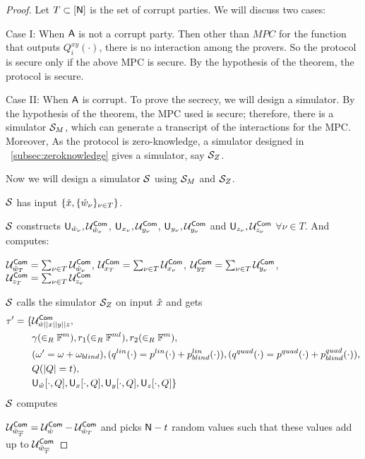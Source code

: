 \begin{proof}
	Let $T\subset [\mathsf{N}]$ is the set of corrupt parties.
	We will discuss two cases: 
	
	Case I: When $\mathsf{A}$ is not a corrupt party.
	Then other than $MPC$ for the function that outputs $Q^{xy}_i(\cdot)$, there is no interaction among the provers. So the protocol is secure only if the above MPC is secure. By the hypothesis of the theorem, the protocol is secure.
	
	Case II: When $\mathsf{A}$ is corrupt.
	To prove the secrecy, we will design a simulator. 
	By the hypothesis of the theorem, the MPC used is secure; therefore, there is a simulator $\mathcal{S}_{M}$, which can generate a transcript of the interactions for the MPC.
	Moreover, As the protocol is zero-knowledge, a simulator designed in ~\ref{subsec:zeroknowledge} gives a simulator, say $\mathcal{S}_{Z}$.
	
	Now we will design a simulator $\mathcal{S}$ using $\mathcal{S}_{M}$ and $\mathcal{S}_{Z}$.
	
	$\mathcal{S}$ has input $\{\hat{x}, \{\hat{w}_{\nu}\}_{\nu \in T}\}$.
	
	$\mathcal{S}$ constructs $\mathsf{U}_{\hat{w}_{\nu}}, \mathcal{U}^{\mathsf{Com}}_{\hat{w}_{\nu}}$, $\mathsf{U}_{x_{\nu}}, \mathcal{U}^{\mathsf{Com}}_{y_{\nu}}$, $\mathsf{U}_{y_{\nu}}, \mathcal{U}^{\mathsf{Com}}_{y_{\nu}}$ and $\mathsf{U}_{z_{\nu}}, \mathcal{U}^{\mathsf{Com}}_{z_{\nu}}$ $\forall \nu\in T$.
	And computes:
	
	\noindent $\mathcal{U}^{\mathsf{Com}}_{\hat{w}_{T}} = \sum_{\nu \in T} \mathcal{U}^{\mathsf{Com}}_{\hat{w}_{\nu}}$,
	$\mathcal{U}^{\mathsf{Com}}_{x_{T}} = \sum_{\nu \in T} \mathcal{U}^{\mathsf{Com}}_{x_{\nu}}$,	
	$\mathcal{U}^{\mathsf{Com}}_{y_{T}} = \sum_{\nu \in T} \mathcal{U}^{\mathsf{Com}}_{y_{\nu}}$,	
	$\mathcal{U}^{\mathsf{Com}}_{z_{T}} = \sum_{\nu \in T} \mathcal{U}^{\mathsf{Com}}_{z_{\nu}}$
	
	\noindent $\mathcal{S}$ calls the simulator $\mathcal{S}_{Z}$ on input $\hat{x}$ and gets 
	\begin{align*}
	\tau' = \{
	& \mathcal{U}^{\mathsf{Com}}_{\hat{w}||x||y||z},\\
	& \gamma(\in_R \mathbb{F}^{m}), r_1(\in_R \mathbb{F}^{ml}), r_2(\in_R \mathbb{F}^m), \\ 
	& (\omega' = \omega+\omega_{blind}), (q^{lin}(\cdot) = p^{lin}(\cdot)+p^{lin}_{blind}(\cdot)), (q^{quad}(\cdot) = p^{quad}(\cdot) + p^{quad}_{blind}(\cdot)),\\
	& Q (|Q|=t),\\
	& \mathsf{U}_{\hat{w}}[\cdot, Q], \mathsf{U}_{x}[\cdot, Q], \mathsf{U}_{y}[\cdot, Q], \mathsf{U}_{z}[\cdot, Q]
	\}
	\end{align*}
	$\mathcal{S}$ computes 
	
	$\mathcal{U}^{\mathsf{Com}}_{\hat{w}_{\overline{T}}} = \mathcal{U}^{\mathsf{Com}}_{\hat{w}}-\mathcal{U}^{\mathsf{Com}}_{\hat{w}_{T}}$
	and picks $\mathsf{N} - t$ random values such that these values add up to $\mathcal{U}^{\mathsf{Com}}_{\hat{w}_{\overline{T}}}$
	

\end{proof}

